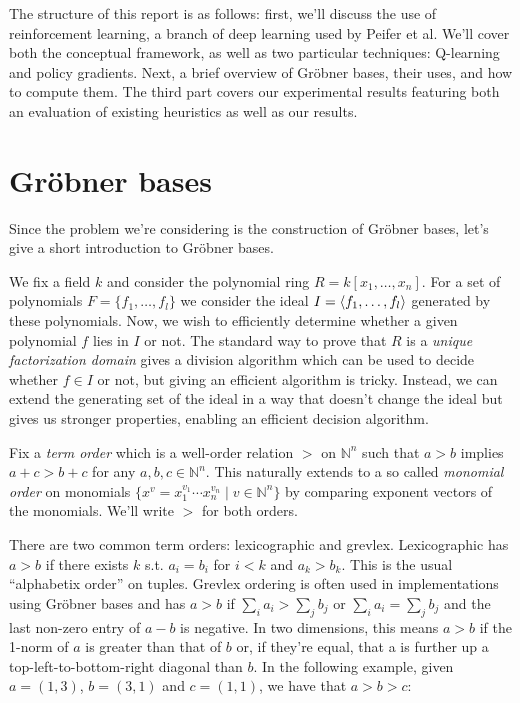 \documentclass{article}
\theoremstyle{changedot}
\theoremstyle{changedotbreak}
\theoremstyle{nonumberplain}
\DeclarePairedDelimiter{\tuple}{\langle}{\rangle}
\begin{document}
The structure of this report is as follows: first, we'll discuss the use of reinforcement learning, a branch of deep learning used by Peifer et al. We'll cover both the conceptual framework, as well as two particular techniques: Q-learning and policy gradients. Next, a brief overview of Gröbner bases, their uses, and how to compute them. The third part covers our experimental results featuring both an evaluation of existing heuristics as well as our results.

\section{Gröbner bases}

Since the problem we're considering is the construction of Gröbner bases, let's give a short introduction to Gröbner bases.

We fix a field $k$ and consider the polynomial ring $R = k[x_{1}, \dots, x_{n}]$. For a set of polynomials $F = \{f_{1}, \dots, f_{l}\}$ we consider the ideal $I = \tuple{f_{1}, \dots, f_{l}}$ generated by these polynomials. Now, we wish to efficiently determine whether a given polynomial $f$ lies in $I$ or not. The standard way to prove that $R$ is a \emph{unique factorization domain} gives a division algorithm which can be used to decide whether $f \in I$ or not, but giving an efficient algorithm is tricky. Instead, we can extend the generating set of the ideal in a way that doesn't change the ideal but gives us stronger properties, enabling an efficient decision algorithm.

Fix a \emph{term order} which is a well-order relation $>$ on $\mathbb N^{n}$ such that $a > b$ implies $a + c > b + c$ for any $a, b, c \in \mathbb N^{n}$. This naturally extends to a so called \emph{monomial order} on monomials $\{x^{v} = x_{1}^{v_{1}} \cdots x_{n}^{v_{n}} \mid v \in \mathbb N^{n}\}$ by comparing exponent vectors of the monomials. We'll write $>$ for both orders.

There are two common term orders: lexicographic and grevlex. Lexicographic has $a > b$ if there exists $k$ s.t. $a_{i} = b_{i}$ for $i < k$ and $a_{k} > b_{k}$. This is the usual ``alphabetix order'' on tuples. Grevlex ordering is often used in implementations using Gröbner bases and has $a > b$ if $\sum_{i} a_{i} > \sum_{j} b_{j}$ or   $\sum_{i} a_{i} = \sum_{j} b_{j}$ and the last non-zero entry of $a - b$ is negative. In two dimensions, this means $a > b$ if the 1-norm of $a$ is greater than that of $b$ or, if they're equal, that a is further up a top-left-to-bottom-right diagonal than $b$. In the following example, given $a=(1, 3)$, $b=(3, 1)$ and $c=(1, 1)$, we have that $a > b > c$:
\end{document}
